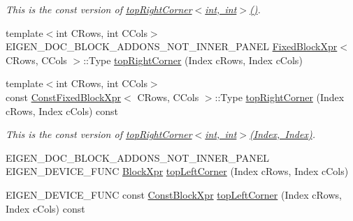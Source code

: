 \begin{DoxyCompactItemize}
\begin{DoxyCompactList}\small\item\em This is the const version of \mbox{\hyperlink{class_eigen_1_1_dense_base_a54bec6dbd37bc39602e0b8e1177d0010}{top\+Right\+Corner$<$int, int$>$()}}. \end{DoxyCompactList}\item 
{\footnotesize template$<$int C\+Rows, int C\+Cols$>$ }\\E\+I\+G\+E\+N\+\_\+\+D\+O\+C\+\_\+\+B\+L\+O\+C\+K\+\_\+\+A\+D\+D\+O\+N\+S\+\_\+\+N\+O\+T\+\_\+\+I\+N\+N\+E\+R\+\_\+\+P\+A\+N\+EL \mbox{\hyperlink{struct_eigen_1_1_dense_base_1_1_fixed_block_xpr}{Fixed\+Block\+Xpr}}$<$ C\+Rows, C\+Cols $>$\+::Type \mbox{\hyperlink{class_eigen_1_1_dense_base_ac52cb78b12c5e5340f1ebdf3dd53e365}{top\+Right\+Corner}} (Index c\+Rows, Index c\+Cols)
\item 
\mbox{\label{class_eigen_1_1_dense_base_af2bf22188e8bd3679e335a3a126602d4}} 
{\footnotesize template$<$int C\+Rows, int C\+Cols$>$ }\\const \mbox{\hyperlink{struct_eigen_1_1_dense_base_1_1_const_fixed_block_xpr}{Const\+Fixed\+Block\+Xpr}}$<$ C\+Rows, C\+Cols $>$\+::Type \mbox{\hyperlink{class_eigen_1_1_dense_base_af2bf22188e8bd3679e335a3a126602d4}{top\+Right\+Corner}} (Index c\+Rows, Index c\+Cols) const
\begin{DoxyCompactList}\small\item\em This is the const version of \mbox{\hyperlink{class_eigen_1_1_dense_base_a5ef049952634d83e1c18bcda3a3e980c}{top\+Right\+Corner$<$int, int$>$(\+Index, Index)}}. \end{DoxyCompactList}\item 
E\+I\+G\+E\+N\+\_\+\+D\+O\+C\+\_\+\+B\+L\+O\+C\+K\+\_\+\+A\+D\+D\+O\+N\+S\+\_\+\+N\+O\+T\+\_\+\+I\+N\+N\+E\+R\+\_\+\+P\+A\+N\+EL E\+I\+G\+E\+N\+\_\+\+D\+E\+V\+I\+C\+E\+\_\+\+F\+U\+NC \mbox{\hyperlink{class_eigen_1_1_block}{Block\+Xpr}} \mbox{\hyperlink{class_eigen_1_1_dense_base_a5fe4cee91037d9586f72bafa5fdd4bd2}{top\+Left\+Corner}} (Index c\+Rows, Index c\+Cols)
\item 
\mbox{\label{class_eigen_1_1_dense_base_ad8de067878e23967ce8a25cbd277f153}} 
E\+I\+G\+E\+N\+\_\+\+D\+E\+V\+I\+C\+E\+\_\+\+F\+U\+NC const \mbox{\hyperlink{class_eigen_1_1_block}{Const\+Block\+Xpr}} \mbox{\hyperlink{class_eigen_1_1_dense_base_ad8de067878e23967ce8a25cbd277f153}{top\+Left\+Corner}} (Index c\+Rows, Index c\+Cols) const

\end{DoxyCompactItemize}
